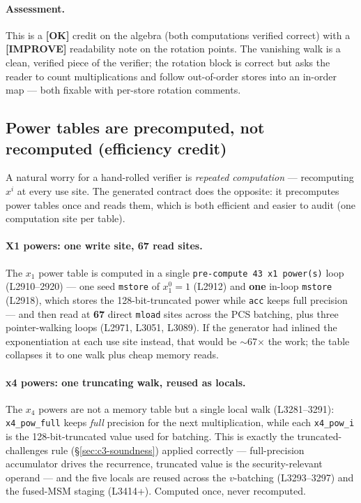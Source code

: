 \paragraph{Assessment.} This is a
\textcolor{tracegreen}{\textbf{[OK]}} credit on the algebra
(both computations verified correct) with a
\textcolor{codegenblue}{\textbf{[IMPROVE]}} readability note on
the rotation points. The vanishing walk is a clean, verified
piece of the verifier; the rotation block is correct but asks the
reader to count multiplications and follow out-of-order stores
into an in-order map --- both fixable with per-store rotation comments.

\subsection{Power tables are precomputed, not recomputed (efficiency credit)}
\label{sec:pr-powertables}

A natural worry for a hand-rolled verifier is \emph{repeated
computation} --- recomputing $x^i$ at every use site. The
generated contract does the opposite: it precomputes power
tables once and reads them, which is both efficient and easier
to audit (one computation site per table).

\paragraph{X1 powers: one write site, 67 read sites.}
The $x_1$ power table is computed in a single
\texttt{pre-compute 43 x1 power(s)} loop (L2910--2920) --- one seed
\texttt{mstore} of $x_1^0=1$ (L2912) and \textbf{one} in-loop
\texttt{mstore} (L2918), which stores the 128-bit-truncated power
while \texttt{acc} keeps full precision --- and then read at
\textbf{67} direct \texttt{mload} sites across the PCS
batching, plus three pointer-walking loops (L2971, L3051, L3089). If the generator had inlined the exponentiation at each
use site instead, that would be $\sim$67$\times$ the work; the
table collapses it to one walk plus cheap memory reads.

\paragraph{x4 powers: one truncating walk, reused as locals.}
The $x_4$ powers are not a memory table but a single local walk
(L3281--3291): \texttt{x4\_pow\_full} keeps \emph{full}
precision for the next multiplication, while each
\texttt{x4\_pow\_i} is the 128-bit-truncated value used for
batching. This is exactly the truncated-challenges rule
(\S\ref{sec:c3-soundness}) applied correctly --- full-precision
accumulator drives the recurrence, truncated value is the
security-relevant operand --- and the five locals are reused
across the $v$-batching (L3293--3297) and the fused-MSM staging
(L3414+). Computed once, never recomputed.

